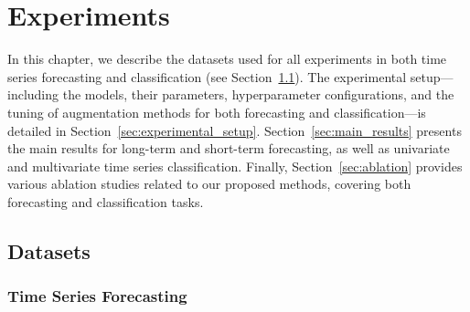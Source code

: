 \chapter{Experiments}
\label{chapter:experiments}

In this chapter, we describe the datasets used for all experiments in both time series forecasting and classification (see Section~\ref{sec:datasets}). The experimental setup—including the models, their parameters, hyperparameter configurations, and the tuning of augmentation methods for both forecasting and classification—is detailed in Section~\ref{sec:experimental_setup}. Section~\ref{sec:main_results} presents the main results for long-term and short-term forecasting, as well as univariate and multivariate time series classification. Finally, Section~\ref{sec:ablation} provides various ablation studies related to our proposed methods, covering both forecasting and classification tasks.

\section{Datasets} \label{sec:datasets}

\subsection*{Time Series Forecasting} \label{subsec:dataset-tsf}


